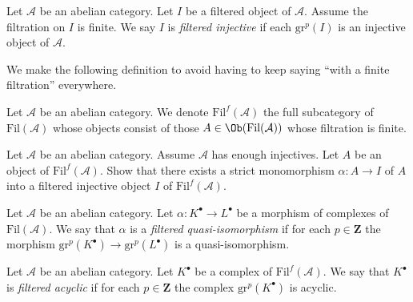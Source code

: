 \begin{definition}
\label{definition-injective-filtered}
Let $\mathcal{A}$ be an abelian category.
Let $I$ be a filtered object of $\mathcal{A}$.
Assume the filtration on $I$ is finite.
We say $I$ is {\it filtered injective} if each $\text{gr}^p(I)$ is
an injective object of $\mathcal{A}$.
\end{definition}

\noindent
We make the following definition to avoid having to keep saying
``with a finite filtration'' everywhere.

\begin{definition}
\label{definition-finite-filtration-category}
Let $\mathcal{A}$ be an abelian category.
We denote {\it $\text{Fil}^f(\mathcal{A})$} the full subcategory
of $\text{Fil}(\mathcal{A})$ whose objects consist of
those $A \in \Ob(\text{Fil}(\mathcal{A}))$
whose filtration is finite.
\end{definition}

\begin{exercise}
\label{exercise-inject-into-injective}
Let $\mathcal{A}$ be an abelian category.
Assume $\mathcal{A}$ has enough injectives.
Let $A$ be an object of $\text{Fil}^f(\mathcal{A})$.
Show that there exists a strict monomorphism $\alpha : A \to I$
of $A$ into a filtered injective object $I$ of $\text{Fil}^f(\mathcal{A})$.
\end{exercise}

\begin{definition}
\label{definition-filtered-quasi-isomorphism}
Let $\mathcal{A}$ be an abelian category.
Let $\alpha : K^\bullet \to L^\bullet$ be a morphism of
complexes of $\text{Fil}(\mathcal{A})$. We say that
$\alpha$ is a {\it filtered quasi-isomorphism} if
for each $p \in \mathbf{Z}$ the morphism
$\text{gr}^p(K^\bullet) \to \text{gr}^p(L^\bullet)$ is
a quasi-isomorphism.
\end{definition}

\begin{definition}
\label{definition-filtered-acyclic}
Let $\mathcal{A}$ be an abelian category.
Let $K^\bullet$ be a complex of $\text{Fil}^f(\mathcal{A})$.
We say that $K^\bullet$ is {\it filtered acyclic} if
for each $p \in \mathbf{Z}$ the complex $\text{gr}^p(K^\bullet)$ is
acyclic.
\end{definition}

